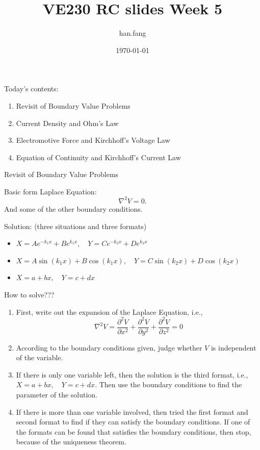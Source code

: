 \documentclass[xcolor={dvipsnames}]{beamer}
\title[VE230 RC slides week 5]{VE230 RC slides Week 5}
\author{han.fang }
\date{\today}
\begin{document}
\begin{frame}
\titlepage
\end{frame}
\begin{frame}
\begin{block}{Today's contents:}
\begin{enumerate}
	\item Revisit of Boundary Value Problems
	\item Current Density and Ohm's Law
	\item Electromotive Force and Kirchhoff's Voltage Law
	\item Equation of Continuity and Kirchhoff's Current Law
\end{enumerate}
\end{block}
\end{frame}
\begin{frame}{Revisit of Boundary Value Problems}
\begin{block}{Basic form}
Laplace Equation:
$$\nabla^2 V=0.$$
And some of the other boundary conditions.
\end{block}
\pause
\begin{block}{Solution: (three situations and three formats)}
\begin{itemize}
	\item $X=Ae^{-k_1x}+Be^{k_1x},\quad Y=Ce^{-k_2x}+De^{k_2x}$
	\item $X=A\sin(k_1x)+B\cos(k_1x),\quad Y=C\sin(k_2x)+D\cos(k_2x)$
	\item $X=a+bx,\quad Y=c+dx$
\end{itemize}
\end{block}
\end{frame}
\begin{frame}
\begin{block}{How to solve???}
\begin{enumerate}
	\item First, write out the expansion of the Laplace Equation, i.e.,
	$$\nabla^2 V=\frac{\partial^2 V}{\partial x^2}+\frac{\partial^2 V}{\partial y^2}+\frac{\partial^2 V}{\partial z^2}=0$$
	\item According to the boundary conditions given, judge whether $V$ is independent of the variable. 
	\item If there is only one variable left, then the solution is the third format, i.e., $X=a+bx,\quad Y=c+dx$. Then use the boundary conditions to find the parameter of the solution.
	\item If there is more than one variable involved, then tried the first format and second format to find if they can satisfy the boundary conditions. If one of the formats can be found that satisfies the boundary conditions, then stop, because of the uniqueness theorem.
\end{enumerate}
\end{block}
\end{frame}
\end{document}
